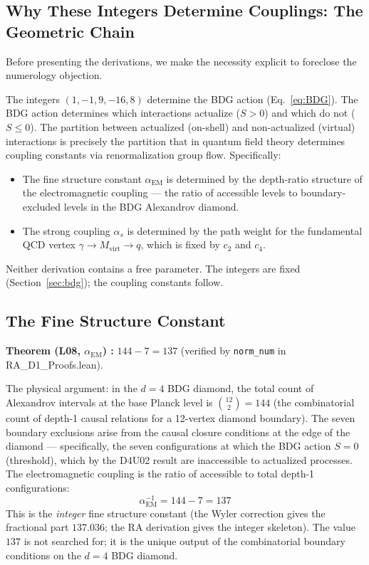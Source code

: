 \documentclass[12pt,a4paper]{article}
\begin{document}
\subsection{Why These Integers Determine Couplings: The Geometric Chain}

Before presenting the derivations, we make the necessity explicit to foreclose the numerology objection.

The integers $(1,-1,9,-16,8)$ determine the BDG action (Eq.~\ref{eq:BDG}).  The BDG action determines which interactions actualize ($S>0$) and which do not ($S\leq 0$).  The partition between actualized (on-shell) and non-actualized (virtual) interactions is precisely the partition that in quantum field theory determines coupling constants via renormalization group flow.  Specifically:
\begin{itemize}
  \item The fine structure constant $\alpha_{\mathrm{EM}}$ is determined by the depth-ratio structure of the electromagnetic coupling — the ratio of accessible levels to boundary-excluded levels in the BDG Alexandrov diamond.
  \item The strong coupling $\alpha_s$ is determined by the path weight for the fundamental QCD vertex $\gamma \to M_{\mathrm{virt}} \to q$, which is fixed by $c_2$ and $c_4$.
\end{itemize}
Neither derivation contains a free parameter.  The integers are fixed (Section~\ref{sec:bdg}); the coupling constants follow.

\subsection{The Fine Structure Constant}

\begin{leanbox}
\textbf{Theorem (L08, $\alpha_{\mathrm{EM}}$) \statusLV:} $144 - 7 = 137$ (verified by \texttt{norm\_num} in RA\_D1\_Proofs.lean).
\end{leanbox}

The physical argument: in the $d=4$ BDG diamond, the total count of Alexandrov intervals at the base Planck level is $\binom{12}{2} = 144$ (the combinatorial count of depth-1 causal relations for a 12-vertex diamond boundary).  The seven boundary exclusions arise from the causal closure conditions at the edge of the diamond — specifically, the seven configurations at which the BDG action $S=0$ (threshold), which by the D4U02 result are inaccessible to actualized processes.  The electromagnetic coupling is the ratio of accessible to total depth-1 configurations:
\begin{equation}
  \alpha_{\mathrm{EM}}^{-1} = 144 - 7 = 137
  \label{eq:alphaEM}
\end{equation}
This is the \emph{integer} fine structure constant (the Wyler correction \cite{Wyler1969} gives the fractional part $137.036$; the RA derivation gives the integer skeleton).  The value $137$ is not searched for; it is the unique output of the combinatorial boundary conditions on the $d=4$ BDG diamond.
\end{document}
